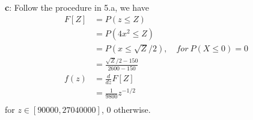 \documentclass[12pt,letterpaper]{article}
\begin{document}
    \textbf{c}: Follow the procedure in 5.a, we have
        \begin{equation*}
            \begin{aligned}
                F[Z] &= P(z \leq Z) \\
                &= P(4x^{2} \leq Z) \\
                &= P(x \leq \sqrt{Z} / 2),\quad for\ P(X \leq 0) = 0 \\
                &= \frac{\sqrt{Z} / 2 - 150}{2600 - 150} \\
                f(z) &= \frac{d}{dz}F[Z] \\
                &= \frac{1}{9800} z^{-1/2} \\
            \end{aligned}
        \end{equation*}
    for $z \in [90000, 27040000]$, 0 otherwise.
\end{document}

